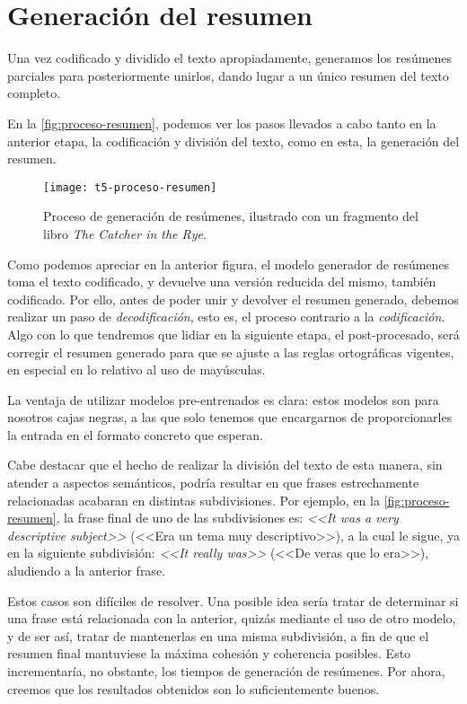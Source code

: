 \newpage

\section{Generación del resumen} \label{sec:resumen}

Una vez codificado y dividido el texto apropiadamente, generamos los resúmenes parciales para posteriormente unirlos, dando lugar a un único resumen del texto completo.

En la \autoref{fig:proceso-resumen}, podemos ver los pasos llevados a cabo tanto en la anterior etapa, la codificación y división del texto, como en esta, la generación del resumen.

\begin{figure}[h]
	\centering
	\texttt{[image: t5-proceso-resumen]}
	\caption[Proceso de generación de resúmenes.]{Proceso de generación de resúmenes, ilustrado con un fragmento del libro \emph{The Catcher in the Rye}.}
	\label{fig:proceso-resumen}	
\end{figure}

Como podemos apreciar en la anterior figura, el modelo generador de resúmenes toma el texto codificado, y devuelve una versión reducida del mismo, también codificado. Por ello, antes de poder unir y devolver el resumen generado, debemos realizar un paso de \emph{decodificación}, esto es, el proceso contrario a la \emph{codificación}. Algo con lo que tendremos que lidiar en la siguiente etapa, el post-procesado, será corregir el resumen generado para que se ajuste a las reglas ortográficas vigentes, en especial en lo relativo al uso de mayúsculas.

La ventaja de utilizar modelos pre-entrenados es clara: estos modelos son para nosotros cajas negras, a las que solo tenemos que encargarnos de proporcionarles la entrada en el formato concreto que esperan.

Cabe destacar que el hecho de realizar la división del texto de esta manera, sin atender a aspectos semánticos, podría resultar en que frases estrechamente relacionadas acabaran en distintas subdivisiones. Por ejemplo, en la \autoref{fig:proceso-resumen}, la frase final de uno de las subdivisiones es: \emph{<<It was a very descriptive subject>>} (<<Era un tema muy descriptivo>>), a la cual le sigue, ya en la siguiente subdivisión: \emph{<<It really was>>} (<<De veras que lo era>>), aludiendo a la anterior frase.

Estos casos son difíciles de resolver. Una posible idea sería tratar de determinar si una frase está relacionada con la anterior, quizás mediante el uso de otro modelo, y de ser así, tratar de mantenerlas en una misma subdivisión, a fin de que el resumen final mantuviese la máxima cohesión y coherencia posibles. Esto incrementaría, no obstante, los tiempos de generación de resúmenes. Por ahora, creemos que los resultados obtenidos son lo suficientemente buenos.

